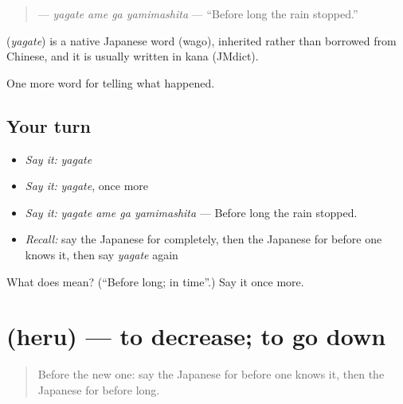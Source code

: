 \begin{quote}
\textbf{  } — \emph{yagate ame ga yamimashita} — \textquotedblleft{}Before long the rain stopped.\textquotedblright{}
\end{quote}

\begin{cousinweb}
\textbf{} (\emph{yagate}) is a native Japanese word (wago), inherited rather than borrowed from Chinese, and it is usually written in kana (JMdict).
\end{cousinweb}

\begin{grammarlens}[title={What you've built}]
One more word for telling what happened.
\end{grammarlens}

\subsection*{Your turn}
\begin{itemize}
\raggedright
  \item \emph{Say it:} \emph{yagate}
  \item \emph{Say it:} \emph{yagate}, once more
  \item \emph{Say it:} \emph{yagate ame ga yamimashita} — Before long the rain stopped.
  \item \emph{Recall:} say the Japanese for completely, then the Japanese for before one knows it, then say \emph{yagate} again
\end{itemize}

\begin{tcolorbox}[breakable,colback=teal!4,colframe=teal!35!black,title={Before you move on}]
What does  mean? (\textquotedblleft{}Before long; in time\textquotedblright{}.) Say it once more.
\end{tcolorbox}
\section[\texorpdfstring{\ja{へる} (heru)}{へる (heru)}]{ (heru) — to decrease; to go down}

\label{lesson:JA-C314-heru}



\begin{quote}
Before the new one: say the Japanese for before one knows it, then the Japanese for before long.
\end{quote}

